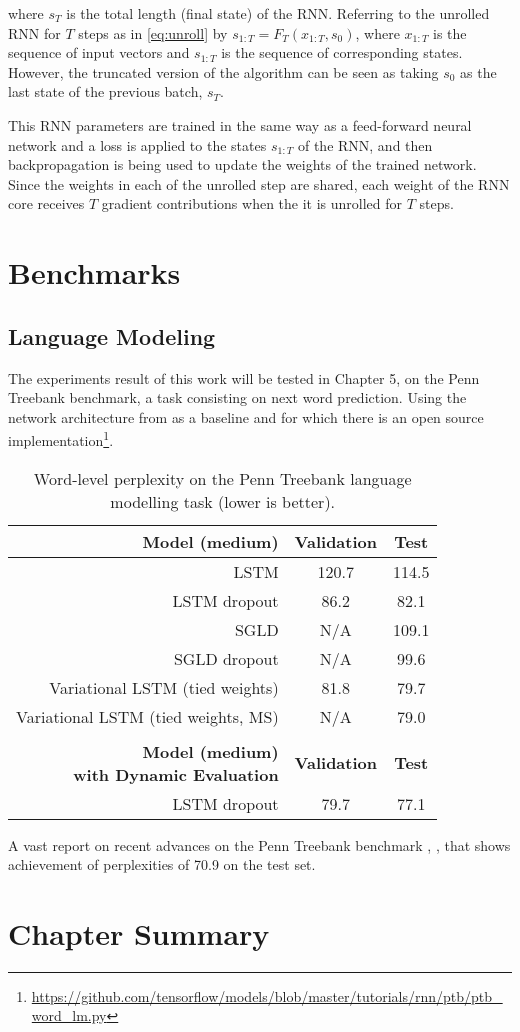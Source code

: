 where $s_T$ is the total length (final state) of the RNN.
Referring to the unrolled RNN for $T$ steps as in \eqref{eq:unroll} by $s_{1:T} = F_T(x_{1:T}, s_0)$,
where $x_{1:T}$ is the sequence of input vectors and $s_{1:T}$ is the sequence of corresponding states. However, the truncated version of the algorithm can be seen as taking $s_0$ as the last state of the previous batch, $s_T$.

This RNN parameters are trained in the same way as a feed-forward neural network and a loss is applied to the states $s_{1:T}$ of the RNN, and then backpropagation is being used to update the weights of the trained network.
Since the weights in each of the unrolled step are shared, each weight of the RNN core receives $T$ gradient contributions when the it is unrolled for $T$ steps.

\section{Benchmarks}

\subsection{Language Modeling}
The experiments result of this work will be tested in Chapter 5, on the Penn Treebank \cite{Marcus1993} benchmark, a task consisting on next word prediction. Using the network architecture from \cite{Zaremba2014} as a baseline and for which there is an open source implementation\footnote{\url{https://github.com/tensorflow/models/blob/master/tutorials/rnn/ptb/ptb_word_lm.py}}.

\begin{table}[t]
	\caption{Word-level perplexity on the Penn Treebank language modelling task (lower is better).}
	\label{tab:ptb}
	\vskip 0.15in
	\centering
	\small
	\begin{tabular}{r|c|c}
		\textbf{Model (medium)}             & \textbf{Validation} & \textbf{Test} \\ 
		\hline
		\abovespace
		LSTM & 120.7 & 114.5\\
		LSTM dropout                        & 	86.2	        &	82.1 \\
		SGLD    	                        &	N/A				&	109.1		\\
		SGLD dropout	                    &	N/A				&	99.6		\\
		Variational LSTM (tied weights)     &	81.8        	&	79.7 \\
		Variational LSTM (tied weights, MS)	&	N/A		        &	79.0		\\
		\hline 
		& &  \\
		\shortstack{\textbf{Model (medium)} \\ \textbf{with Dynamic Evaluation}}
		& \textbf{Validation} & \textbf{Test} \\
		\hline
		\abovespace
		LSTM dropout                      & 	79.7	        &	77.1 \\
		\hline
	\end{tabular}
	\vskip -0.1in
\end{table}

A vast report on recent advances on the Penn Treebank benchmark \cite{Kim2016}, \cite{Zilly2016}, \cite{Merity2016} that shows achievement of perplexities of 70.9 on the test set.

\section{Chapter Summary}
